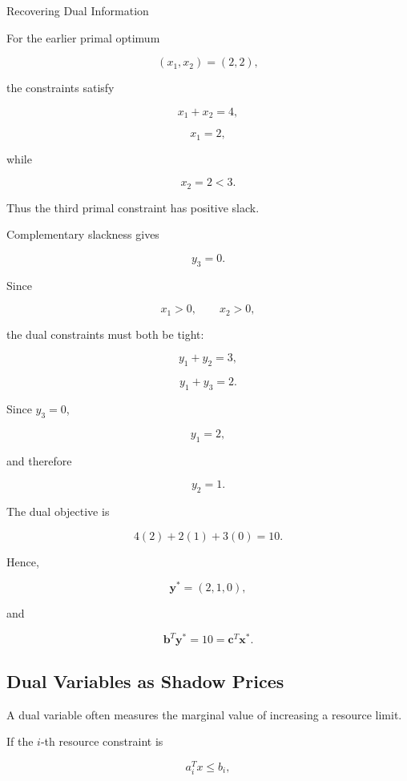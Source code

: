 \begin{workedexamplebox}{Recovering Dual Information}

For the earlier primal optimum

\[
(x_1,x_2)=(2,2),
\]

the constraints satisfy

\[
x_1+x_2=4,
\]

\[
x_1=2,
\]

while

\[
x_2=2<3.
\]

Thus the third primal constraint has positive slack.

Complementary slackness gives

\[
\boxed{
y_3=0.
}
\]

Since

\[
x_1>0,
\qquad
x_2>0,
\]

the dual constraints must both be tight:

\[
y_1+y_2=3,
\]

\[
y_1+y_3=2.
\]

Since \(y_3=0\),

\[
y_1=2,
\]

and therefore

\[
y_2=1.
\]

The dual objective is

\[
4(2)+2(1)+3(0)=10.
\]

Hence,

\begin{answerbox}
\[
\boxed{
\mathbf{y}^*
=
(2,1,0),
}
\]

and

\[
\boxed{
\mathbf{b}^T\mathbf{y}^*
=
10
=
\mathbf{c}^T\mathbf{x}^*.
}
\]
\end{answerbox}

\end{workedexamplebox}

\subsection{Dual Variables as Shadow Prices}
\label{subsec:dual-shadow-prices}

A dual variable often measures the marginal value of increasing a resource
limit.

If the \(i\)-th resource constraint is

\[
a_i^T x\leq b_i,
\]

